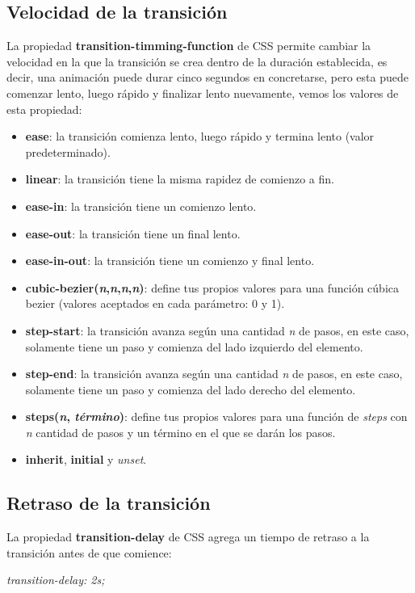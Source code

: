 \subsection{Velocidad de la transición}

La propiedad \textbf{transition-timming-function} de CSS permite cambiar la velocidad en la que la transición se crea dentro de la duración establecida, es decir, una animación puede durar cinco segundos en concretarse, pero esta puede comenzar lento, luego rápido y finalizar lento nuevamente, vemos los valores de esta propiedad:
\begin{itemize}
    \item \textbf{ease}: la transición comienza lento, luego rápido y termina lento (valor predeterminado).
    \item \textbf{linear}: la transición tiene la misma rapidez de comienzo a fin.
    \item \textbf{ease-in}: la transición tiene un comienzo lento.
    \item \textbf{ease-out}: la transición tiene un final lento.
    \item \textbf{ease-in-out}: la transición tiene un comienzo y final lento.
    \item \textbf{cubic-bezier(\textit{n},\textit{n},\textit{n},\textit{n})}: define tus propios valores para una función cúbica bezier (valores aceptados en cada parámetro: 0 y 1).
    \item \textbf{step-start}: la transición avanza según una cantidad \textit{n} de pasos, en este caso, solamente tiene un paso y comienza del lado izquierdo del elemento.
    \item \textbf{step-end}: la transición avanza según una cantidad \textit{n} de pasos, en este caso, solamente tiene un paso y comienza del lado derecho del elemento.
    \item \textbf{steps(\textit{n}, \textit{término})}: define tus propios valores para una función de \textit{steps} con \textit{n} cantidad de pasos y un término en el que se darán los pasos.
    \item \textbf{inherit}, \textbf{initial} y \textit{unset}.
\end{itemize}


\subsection{Retraso de la transición}

La propiedad \textbf{transition-delay} de CSS agrega un tiempo de retraso a la transición antes de que comience:
\begin{center}
    \textit{transition-delay: 2s;}
\end{center}

